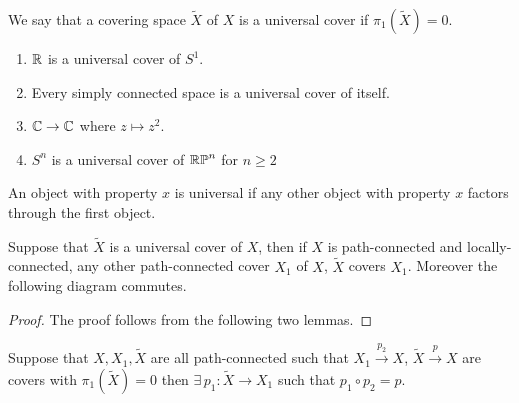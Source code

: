 \documentclass[12pt]{amsart}
\begin{document}
\begin{definition}
    We say that a covering space $\widetilde{X}$ of $X$ is a \textbf{}{universal cover} if $\pi_1(\widetilde{X}) = 0$. 
    \begin{example}
        
        \begin{enumerate}
            \item $\mathbb R$ is a universal cover of $S^1$. 
            \item Every simply connected space is a universal cover of itself. 
            \item $\mathbb C \to \mathbb C$ where $z \mapsto z^2$. 
            \item $S^n$ is a universal cover of $\mathbb{RP}^n$ for $n \geq 2$
        \end{enumerate}
    \end{example}
\end{definition}

\begin{remark}
    An object with property $x$ is universal if any other object with property $x$ factors through the first object. 
\end{remark}

\begin{theorem}
    Suppose that $\widetilde{X}$ is a universal cover of $X$, then if $X$ is path-connected and locally-connected, any other path-connected cover $X_1$ of $X$, $\widetilde{X}$ covers $X_1$. Moreover the following diagram commutes. 

    \begin{center}
    \end{center}
\end{theorem}

\begin{proof}
    The proof follows from the following two lemmas. 
\end{proof}
    
\begin{lemma}
    Suppose that $X, X_1, \widetilde{X}$ are all path-connected such that $X_1 \xrightarrow{p_2} X$, $\widetilde{X} \xrightarrow{p} X$ are covers with $\pi_1(\widetilde{X}) = 0$ then $\exists \, p_1: \widetilde{X} \to X_1$ such that $p_1 \circ p_2 = p$. 
\end{lemma}
\end{document}
